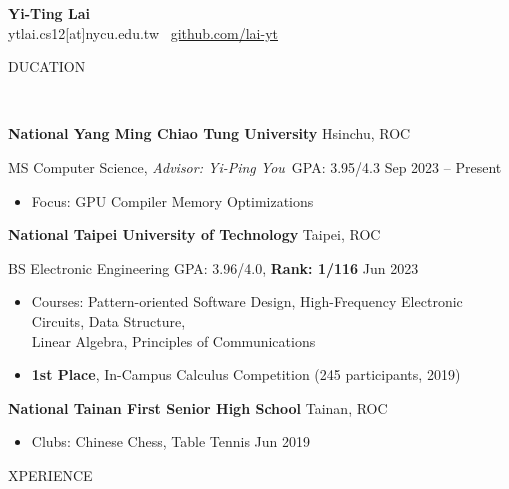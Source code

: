 \documentclass[11pt]{article}
\begin{document}
\begin{center}
    \textbf{\Large Yi-Ting Lai}\\
    ytlai.cs12[at]nycu.edu.tw \textbullet \ \href{https://github.com/lai-yt}{github.com/lai-yt}
\end{center}

\vspace{0.5pt}

\begin{center}
    \scalebox{1.3}{E}DUCATION\raggedright \,\hrulefill
\end{center}

\textbf{National Yang Ming Chiao Tung University} \hfill Hsinchu, ROC

MS Computer Science, \textit{Advisor: Yi-Ping You} \,\qquad GPA: 3.95/4.3 \hfill Sep 2023 -- Present

\begin{itemize}[noitemsep, topsep=0pt, partopsep=0pt, parsep=0pt, leftmargin=*]
    \item Focus: GPU Compiler Memory Optimizations
\end{itemize}

\vspace{6pt}

\textbf{National Taipei University of Technology} \hfill Taipei, ROC

BS Electronic Engineering \enskip \qquad \qquad \qquad \qquad \qquad GPA: 3.96/4.0, \textbf{Rank: 1/116} \hfill Jun 2023
\begin{itemize}[noitemsep, topsep=0pt, partopsep=0pt, parsep=0pt, leftmargin=*]
    \item Courses: Pattern-oriented Software Design, High-Frequency Electronic Circuits, Data Structure,\\Linear Algebra, Principles of Communications
    \item \textbf{1st Place}, In-Campus Calculus Competition (245 participants, 2019)
\end{itemize}

\vspace{6pt}

\textbf{National Tainan First Senior High School} \hfill    Tainan, ROC

\begin{itemize}[noitemsep, topsep=0pt, partopsep=0pt, parsep=0pt, leftmargin=*]
    \item Clubs: Chinese Chess, Table Tennis \hfill Jun 2019
\end{itemize}

\begin{center}
    \scalebox{1.3}{E}XPERIENCE\raggedright \,\hrulefill
\end{center}
\end{document}
